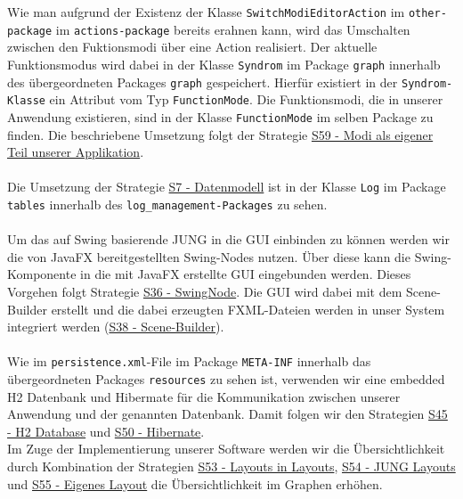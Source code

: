 \documentclass[enabledeprecatedfontcommands,fontsize=11pt,paper=a4,twoside]{scrartcl}
\newcounter{one}
\begin{document}
Wie man aufgrund der Existenz der Klasse \texttt{SwitchModiEditorAction} im \texttt{other-package} im \texttt{actions-package} bereits erahnen kann, wird das Umschalten zwischen den Fuktionsmodi über eine Action realisiert. Der aktuelle Funktionsmodus wird dabei in der Klasse \texttt{Syndrom} im Package \texttt{graph} innerhalb des übergeordneten Packages \texttt{graph} gespeichert. Hierfür existiert in der \texttt{Syndrom-Klasse} ein Attribut vom Typ \texttt{FunctionMode}. Die Funktionsmodi, die in unserer Anwendung existieren, sind in der Klasse \texttt{FunctionMode} im selben Package zu finden. Die beschriebene Umsetzung folgt der Strategie \hyperlink{uuu}{S59 - Modi als eigener Teil unserer Applikation}. \\ \\

Die Umsetzung der Strategie \hyperlink{aaa}{S7 - Datenmodell} ist in der Klasse \texttt{Log} im Package \texttt{tables} innerhalb des \texttt{log\_management-Packages} zu sehen. \\ \\



Um das auf Swing basierende JUNG in die GUI einbinden zu können werden wir die von JavaFX bereitgestellten Swing-Nodes nutzen. Über diese kann die Swing-Komponente in die mit JavaFX erstellte GUI eingebunden werden. Dieses Vorgehen folgt Strategie \hyperlink{lll}{S36 - SwingNode}. Die GUI wird dabei mit dem Scene-Builder erstellt und die dabei erzeugten FXML-Dateien werden in unser System integriert werden (\hyperlink{mmm}{S38 - Scene-Builder}). \\ \\

Wie im \texttt{persistence.xml}-File im Package \texttt{META-INF} innerhalb das übergeordneten Packages \texttt{resources} zu sehen ist, verwenden wir eine embedded H2 Datenbank und Hibermate für die Kommunikation zwischen unserer Anwendung und der genannten Datenbank. Damit folgen wir den Strategien \hyperlink{ppp}{S45 - H2 Database} und \hyperlink{rrr}{S50 - Hibernate}. \\

Im Zuge der Implementierung unserer Software werden wir die Übersichtlichkeit durch Kombination der Strategien \hyperlink{sss}{S53 - Layouts in Layouts}, \hyperlink{xee}{S54 - JUNG Layouts} und \hyperlink{xff}{S55 - Eigenes Layout} die Übersichtlichkeit im Graphen erhöhen.
\end{document}
